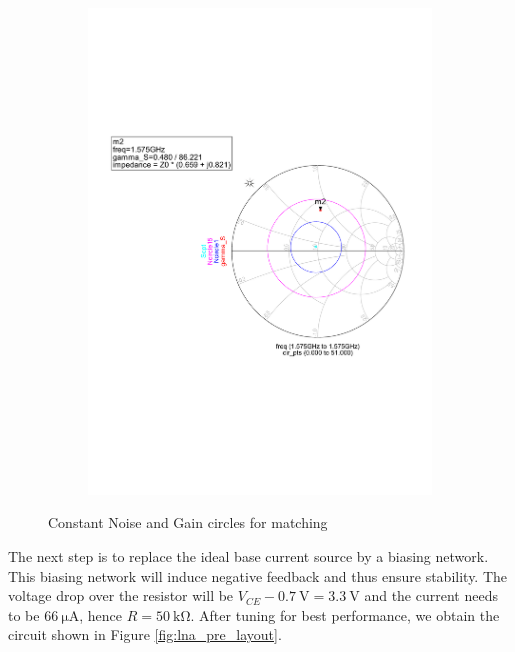 \documentclass[a4paper]{article}        %
\begin{document}
\begin{figure}[H]
\begin{subfigure}{0.5\textwidth}
				\centering
				\includegraphics[width=\textwidth]{fig/LNA/LNA_noise_circle.pdf}
			\end{subfigure}
				\caption{Constant Noise and Gain circles for matching}
				\label{fig:lna_circles}
			\end{figure}

			The next step is to replace the ideal base current source by a biasing network. This biasing network will induce negative feedback and thus ensure stability. The voltage drop over the resistor will be $V_{CE} - \SI{0.7}{\volt} = \SI{3.3}{\volt}$ and the current needs to be $\SI{66}{\micro\ampere}$, hence $R = \SI{50}{\kilo\ohm}$. After tuning for best performance, we obtain the circuit shown in Figure \ref{fig:lna_pre_layout}.
\end{document}
